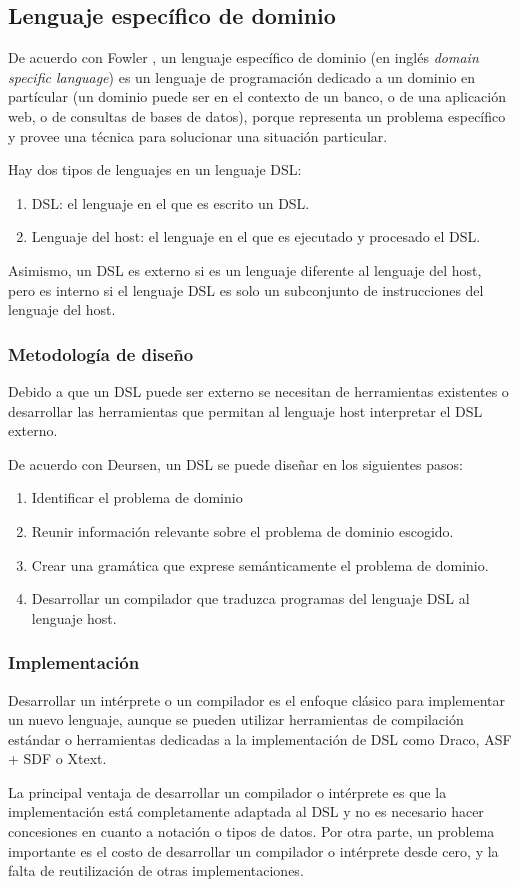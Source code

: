 \subsection{Lenguaje específico de dominio}
De acuerdo con Fowler \cite{fowler_domain-specific_2010}, un lenguaje específico de dominio (en inglés \textit{domain specific language}) es un lenguaje de programación dedicado a un dominio en partícular (un dominio puede ser en el contexto de un banco, o de una aplicación web, o de consultas de bases de datos), porque representa un problema específico y provee una técnica para solucionar una situación particular. 

Hay dos tipos de lenguajes en un lenguaje DSL:

\begin{enumerate}
  \item DSL: el lenguaje en el que es escrito un DSL.
  \item Lenguaje del host: el lenguaje en el que es ejecutado y procesado el DSL.
\end{enumerate}


Asimismo, un DSL es externo si es un lenguaje diferente al lenguaje del host, pero es interno si el lenguaje DSL es solo un subconjunto de instrucciones del lenguaje del host.
\subsubsection*{Metodología de diseño}

Debido a que un DSL puede ser externo se necesitan de herramientas existentes o desarrollar las herramientas que permitan al lenguaje host interpretar el DSL externo.

De acuerdo con Deursen\cite{van_deursen_domain-specific_2000}, un DSL se puede diseñar en los siguientes pasos:
\begin{enumerate}
  \item Identificar el problema de dominio
  \item Reunir información relevante sobre el problema de dominio escogido.
  \item Crear una gramática que exprese semánticamente el problema de dominio.
  \item Desarrollar un compilador que traduzca programas del lenguaje DSL al lenguaje host.
\end{enumerate} 

\subsubsection*{Implementación}

Desarrollar un intérprete o un compilador es el enfoque clásico para implementar un nuevo lenguaje, aunque se pueden utilizar herramientas de compilación estándar o herramientas dedicadas a la implementación de DSL como Draco, ASF + SDF o Xtext.

La principal ventaja de desarrollar un compilador o intérprete es que la implementación está completamente adaptada al DSL y no es necesario hacer concesiones en cuanto a notación o tipos de datos. Por otra parte, un problema importante es el costo de desarrollar un compilador o intérprete desde cero, y la falta de reutilización de otras implementaciones\cite{van_deursen_domain-specific_2000}.